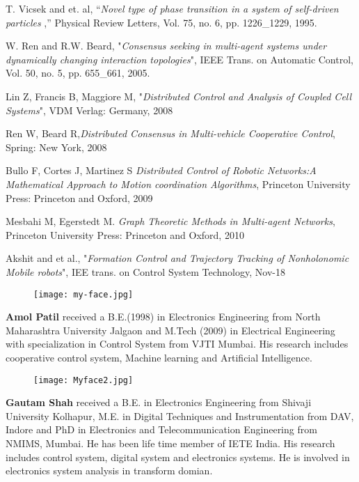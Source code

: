 \documentclass[twocolumn]{IETEJR}
\begin{document}
\begin{thebibliography}{00}
 T. Vicsek and et. al, “{\it Novel type of phase transition in a system of self-driven particles },” Physical Review Letters, Vol. 75, no. 6, pp. 1226\_1229, 1995.

 W. Ren and R.W. Beard, "{\it Consensus seeking in multi-agent systems
under dynamically changing interaction topologies}", IEEE Trans. on Automatic Control,
Vol. 50, no. 5, pp. 655\_661, 2005.

 Lin Z, Francis B, Maggiore M, "{\it Distributed Control and Analysis of Coupled Cell Systems}", VDM Verlag: Germany, 2008

 Ren W, Beard R,{\it Distributed Consensus in Multi-vehicle Cooperative Control}, Spring: New York, 2008

 Bullo F, Cortes  J, Martinez S {\it Distributed Control of Robotic Networks:A Mathematical Approach to Motion coordination Algorithms}, Princeton University Press: Princeton and Oxford, 2009

 Mesbahi M, Egerstedt M. {\it Graph Theoretic Methods in Multi-agent Networks}, Princeton University Press: Princeton and Oxford, 2010  

 Akshit and et al., "{\it Formation Control and Trajectory Tracking of Nonholonomic Mobile robots}",  IEE trans. on Control System Technology, Nov-18

\end{thebibliography}

\vspace{0.1in}

\begin{wrapfigure}{l}{25mm} 
\texttt{[image: my-face.jpg]}
\end{wrapfigure}\par
\textbf{Amol Patil} received a B.E.(1998) in Electronics Engineering from North Maharashtra University Jalgaon and M.Tech (2009) in Electrical Engineering with specialization in Control System from VJTI Mumbai. His research includes cooperative control system, Machine learning and Artificial Intelligence. 
\vspace{0.1in}
\begin{wrapfigure}{l}{25mm} 
	\texttt{[image: Myface2.jpg]}
\end{wrapfigure}\par
\textbf{Gautam Shah} received a B.E. in Electronics Engineering from Shivaji University Kolhapur, M.E. in Digital Techniques and Instrumentation from DAV, Indore and PhD in Electronics and Telecommunication Engineering from NMIMS, Mumbai. He has been life time member of IETE India. His research includes control system, digital system and electronics systems. He is involved in electronics system analysis in transform domian.
\end{document}
